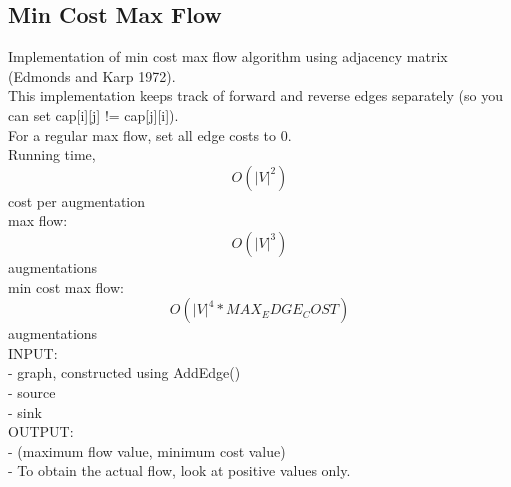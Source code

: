 \documentclass[11pt, oneside]{article}
\begin{document}
\subsection{Min Cost Max Flow}
Implementation of min cost max flow algorithm using adjacency matrix (Edmonds and Karp 1972).\\
This implementation keeps track of forward and reverse edges separately (so you can set cap[i][j] != cap[j][i]).\\
For a regular max flow, set all edge costs to 0.\\
Running time, \[O(|V|^2)\] cost per augmentation\\
    max flow:           \[O(|V|^3)\] augmentations\\
    min cost max flow:  \[O(|V|^4 * MAX_EDGE_COST)\] augmentations\\
INPUT: \\
    - graph, constructed using AddEdge()\\
    - source\\
    - sink\\
OUTPUT:\\
    - (maximum flow value, minimum cost value)\\
    - To obtain the actual flow, look at positive values only.\\
\end{document}
